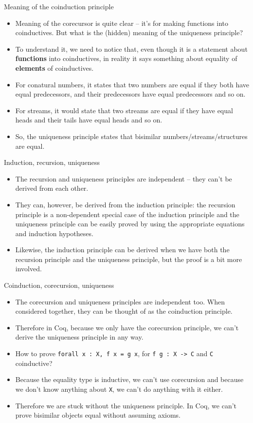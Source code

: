 \documentclass{beamer}
\begin{document}
\begin{frame}{Meaning of the coinduction principle}
\begin{itemize}
	\item Meaning of the corecursor is quite clear -- it's for making functions into coinductives. But what is the (hidden) meaning of the uniqueness principle?
	\item To understand it, we need to notice that, even though it is a statement about \textbf{functions} into coinductives, in reality it says something about equality of \textbf{elements} of coinductives.
	\item For conatural numbers, it states that two numbers are equal if they both have equal predecessors, and their predecessors have equal predecessors and so on.
	\item For streams, it would state that two streams are equal if they have equal heads and their tails have equal heads and so on.
	\item So, the uniqueness principle states that bisimilar numbers/streams/structures are equal.
\end{itemize}
\end{frame}

\begin{frame}{Induction, recursion, uniqueness}
\begin{itemize}
	\item The recursion and uniqueness principles are independent -- they can't be derived from each other.
	\item They can, however, be derived from the induction principle: the recursion principle is a non-dependent special case of the induction principle and the uniqueness principle can be easily proved by using the appropriate equations and induction hypotheses.
	\item Likewise, the induction principle can be derived when we have both the recursion principle and the uniqueness principle, but the proof is a bit more involved.
\end{itemize}
\end{frame}

\begin{frame}{Coinduction, corecursion, uniqueness}
\begin{itemize}
	\item The corecursion and uniqueness principles are independent too. When considered together, they can be thought of as the coinduction principle.
	\item Therefore in Coq, because we only have the corecursion principle, we can't derive the uniqueness principle in any way.
	\item How to prove \texttt{forall x : X, f x = g x}, for \texttt{f g : X -> C} and \texttt{C} coinductive?
	\item Because the equality type is inductive, we can't use corecursion and because we don't know anything about \texttt{X}, we can't do anything with it either.
	\item Therefore we are stuck without the uniqueness principle. In Coq, we can't prove bisimilar objects equal without assuming axioms.
\end{itemize}
\end{frame}
\end{document}
